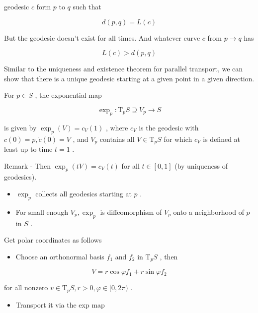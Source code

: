 \documentclass[lang=cn,a4paper,11pt,openany,twoside]{elegantbook}
\begin{document}
geodesic \(c\) form \(p\) to \(q\) such that

\[
d\left( {p,q}\right)  = L\left( c\right)
\]

But the geodesic doesn’t exist for all times. And whatever curve \(c\) from \(p \rightarrow  q\) has

\[
L\left( c\right)  > d\left( {p,q}\right)
\]

Similar to the uniqueness and existence theorem for parallel transport, we can show that there is a unique geodesic starting at a given point in a given direction.

For \(p \in  S\) , the exponential map

\[
{\exp }_{p} : {\mathrm{T}}_{p}S \supseteq  {V}_{p} \rightarrow  S
\]

is given by \({\exp }_{p}\left( V\right)  = {c}_{V}\left( 1\right)\) , where \({c}_{V}\) is the geodesic with \(c\left( 0\right)  = p,\dot{c}\left( 0\right)  = V\) , and \({V}_{p}\) contains all \(V \in  {\mathrm{T}}_{p}S\) for which \({c}_{V}\) is defined at least up to time \(t = 1\) .

Remark - Then \({\exp }_{p}\left( {tV}\right)  = {c}_{V}\left( t\right)\) for all \(t \in  \left\lbrack  {0,1}\right\rbrack\) (by uniqueness of geodesics).

\begin{itemize}\relax
\item\relax \({\exp }_{p}\) collects all geodesics starting at \(p\) .
\end{itemize}

\begin{itemize}\relax
\item\relax For small enough \({V}_{p},{\exp }_{p}\) is diffeomorphism of \({V}_{p}\) onto a neighborhood of \(p\) in \(S\) .
\end{itemize}

Get polar coordinates as follows

\begin{itemize}\relax
\item\relax Choose an orthonormal basis \({f}_{1}\) and \({f}_{2}\) in \({\mathrm{T}}_{p}S\) , then
\end{itemize}

\[
V = r\cos \varphi {f}_{1} + r\sin \varphi {f}_{2}
\]

for all nonzero \(v \in  {\mathrm{T}}_{p}S,r > 0,\varphi  \in  \lbrack 0,{2\pi })\) .

\begin{itemize}\relax
\item\relax Transport it via the exp map
\end{itemize}
\end{document}
